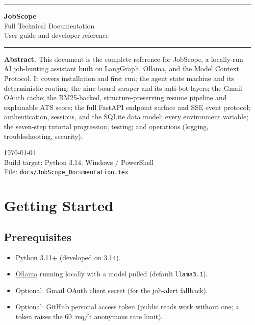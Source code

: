 \documentclass[11pt,a4paper]{article}
\newcommand{\file}[1]{\texttt{\small #1}}
\newcommand{\tool}[1]{\texttt{#1}}
\begin{document}
\begin{titlepage}
  \centering
  \vspace*{2.2cm}
  {\color{indigo}\rule{\textwidth}{2pt}}

  \vspace{0.9cm}
  {\fontsize{32}{38}\selectfont\bfseries\color{indigo} JobScope}\\[6pt]
  {\Large Full Technical Documentation\\[2pt]
   User guide and developer reference}

  \vspace{0.9cm}
  {\color{indigo}\rule{\textwidth}{2pt}}

  \vspace{2.4cm}
  \begin{minipage}{0.8\textwidth}
    \small
    \textbf{Abstract.} This document is the complete reference for JobScope,
    a locally-run AI job-hunting assistant built on LangGraph, Ollama, and
    the Model Context Protocol. It covers installation and first run; the
    agent state machine and its deterministic routing; the nine-board
    scraper and its anti-bot layers; the Gmail OAuth cache; the
    BM25-backed, structure-preserving resume pipeline and explainable ATS
    score; the full FastAPI endpoint surface and SSE event protocol;
    authentication, sessions, and the SQLite data model; every environment
    variable; the seven-step tutorial progression; testing; and operations
    (logging, troubleshooting, security).
  \end{minipage}

  \vfill
  {\small \today \\[2pt]
   Build target: Python 3.14, Windows / PowerShell \\[2pt]
   File: \file{docs/JobScope\_Documentation.tex}}
\end{titlepage}

\tableofcontents
\clearpage

\section{Getting Started}
\label{sec:start}

\subsection{Prerequisites}
\begin{itemize}[leftmargin=2em]
  \item Python 3.11+ (developed on 3.14).
  \item \href{https://ollama.com/download}{Ollama} running locally with a
        model pulled (default \tool{llama3.1}).
  \item Optional: Gmail OAuth client secret (for the job-alert fallback).
  \item Optional: GitHub personal access token (public reads work without
        one; a token raises the 60~req/h anonymous rate limit).
\end{itemize}
\end{document}
